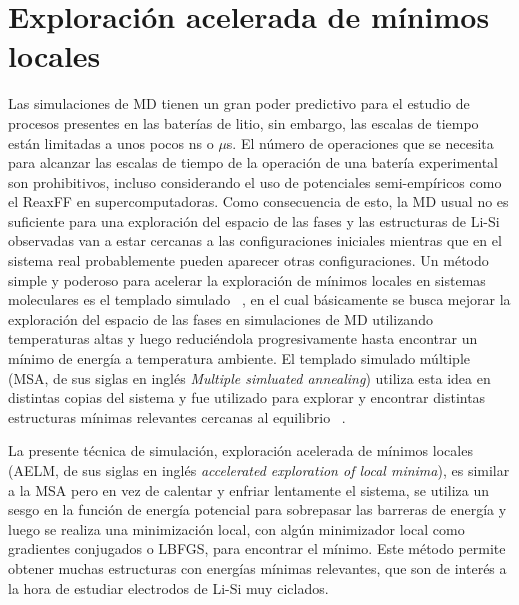 \section{Exploración acelerada de mínimos locales}\label{s:aelm}

Las simulaciones de MD tienen un gran poder predictivo para el estudio de 
procesos presentes en las baterías de litio, sin embargo, las escalas de tiempo
están limitadas a unos pocos ns o $\mu$s. El número de operaciones que se 
necesita para alcanzar las escalas de tiempo de la operación de una batería 
experimental son prohibitivos, incluso considerando el uso de potenciales 
semi-empíricos como el ReaxFF en supercomputadoras. Como consecuencia de esto,
la MD usual no es suficiente para una exploración del espacio de las fases y las
estructuras de Li-Si observadas van a estar cercanas a las configuraciones 
iniciales mientras que en el sistema real probablemente pueden aparecer otras
configuraciones. Un método simple y poderoso para acelerar la exploración de 
mínimos locales en sistemas moleculares es el templado simulado 
~\cite{kirkpatrick1983}, en el cual básicamente se busca mejorar la exploración
del espacio de las fases en simulaciones de MD utilizando temperaturas altas y
luego reduciéndola progresivamente hasta encontrar un mínimo de energía a 
temperatura ambiente. El templado simulado múltiple (MSA, de sus siglas en inglés 
\textit{Multiple simluated annealing}) utiliza esta idea en distintas copias del 
sistema y fue utilizado para explorar y encontrar distintas estructuras mínimas 
relevantes cercanas al equilibrio ~\cite{hao2015}.

La presente técnica de simulación, exploración acelerada de mínimos locales (AELM,
de sus siglas en inglés \textit{accelerated exploration of local minima}), es 
similar a la MSA pero en vez de calentar y enfriar lentamente el sistema, se 
utiliza un sesgo en la función de energía potencial para sobrepasar las barreras
de energía y luego se realiza una minimización local, con algún minimizador local 
como gradientes conjugados o LBFGS, para encontrar el mínimo. Este método permite 
obtener muchas estructuras con energías mínimas relevantes, que son de interés a 
la hora de estudiar electrodos de Li-Si muy ciclados.

